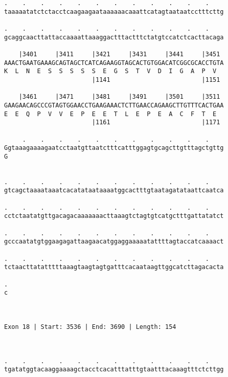 \documentclass{article}
\begin{document}
\begin{Verbatim}
.    .    .    .    .    .    .    .    .    .    .    .    
taaaaatatctctacctcaagaagaataaaaaacaaattcatagtaataatcctttcttg
                                                            
.    .    .    .    .    .    .    .    .    .    .    .    
gcaggcaacttattaccaaaattaaaggactttactttctatgtccatctcacttacaga
                                                            
    |3401     |3411     |3421     |3431     |3441     |3451 
AAACTGAATGAAAGCAGTAGCTCATCAGAAGGTAGCACTGTGGACATCGGCGCACCTGTA
K  L  N  E  S  S  S  S  S  E  G  S  T  V  D  I  G  A  P  V  
                        |1141                         |1151 
  
    |3461     |3471     |3481     |3491     |3501     |3511 
GAAGAACAGCCCGTAGTGGAACCTGAAGAAACTCTTGAACCAGAAGCTTGTTTCACTGAA
E  E  Q  P  V  V  E  P  E  E  T  L  E  P  E  A  C  F  T  E  
                        |1161                         |1171 
  
     .    .    .    .    .    .    .    .    .    .    .    
Ggtaaagaaaagaatcctaatgttaatctttcatttggagtgcagcttgtttagctgttg
G                                                           
                                                            
  
.    .    .    .    .    .    .    .    .    .    .    .    
gtcagctaaaataaatcacatataataaaatggcactttgtaatagatataattcaatca
                                                            
.    .    .    .    .    .    .    .    .    .    .    .    
cctctaatatgttgacagacaaaaaaacttaaagtctagtgtcatgctttgattatatct
                                                            
.    .    .    .    .    .    .    .    .    .    .    .    
gcccaatatgtggaagagattaagaacatggaggaaaaatattttagtaccatcaaaact
                                                            
.    .    .    .    .    .    .    .    .    .    .    .    
tctaacttatatttttaaagtaagtagtgatttcacaataagttggcatcttagacacta
                                                            
.
c
 
 
 
Exon 18 | Start: 3536 | End: 3690 | Length: 154



.    .    .    .    .    .    .    .    .    .    .    .    
tgatatggtacaaggaaaagctacctcacatttatttgtaatttacaaagtttctcttgg
                                                            

\end{Verbatim}
\end{document}
